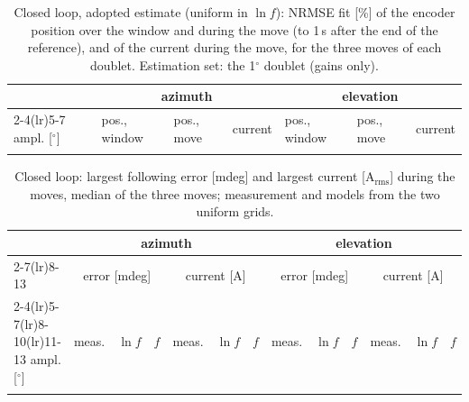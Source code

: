 \documentclass[10pt,a4paper]{article}
\numberwithin{equation}{section}
\begin{document}
\begin{table}[H]\centering\scriptsize\setlength{\tabcolsep}{3pt}
\caption{Closed loop, adopted estimate (uniform in $\ln f$): NRMSE fit [\%] of the encoder position over the window and during the move (to 1\,s after the end of the reference), and of the current during the move, for the three moves of each doublet. Estimation set: the 1$^\circ$ doublet (gains only).}\label{tab:cl}
\begin{tabular}{lllllll}\toprule
& \multicolumn{3}{c}{azimuth} & \multicolumn{3}{c}{elevation} \\
\cmidrule(lr){2-4}\cmidrule(lr){5-7}
ampl. [$^\circ$] & pos., window & pos., move & current & pos., window & pos., move & current \\ \midrule
\\ \bottomrule
\end{tabular}\end{table}

\begin{table}[H]\centering\scriptsize\setlength{\tabcolsep}{3.5pt}
\caption{Closed loop: largest following error [mdeg] and largest current [A$_\mathrm{rms}$] during the moves, median of the three moves; measurement and models from the two uniform grids.}\label{tab:cl_peaks}
\begin{tabular}{lrrrrrrrrrrrr}\toprule
& \multicolumn{6}{c}{azimuth} & \multicolumn{6}{c}{elevation} \\
\cmidrule(lr){2-7}\cmidrule(lr){8-13}
& \multicolumn{3}{c}{error [mdeg]} & \multicolumn{3}{c}{current [A]} & \multicolumn{3}{c}{error [mdeg]} & \multicolumn{3}{c}{current [A]} \\
\cmidrule(lr){2-4}\cmidrule(lr){5-7}\cmidrule(lr){8-10}\cmidrule(lr){11-13}
ampl. [$^\circ$] & meas. & $\ln f$ & $f$ & meas. & $\ln f$ & $f$ & meas. & $\ln f$ & $f$ & meas. & $\ln f$ & $f$ \\ \midrule
\\ \bottomrule
\end{tabular}\end{table}
\end{document}
